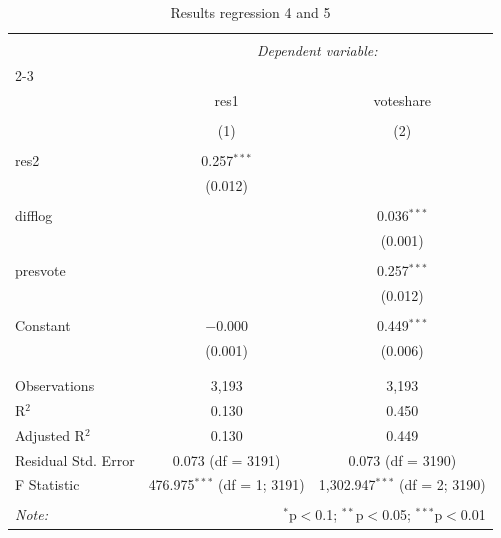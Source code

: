 \documentclass[12pt,letterpaper]{article}
\begin{document}
\begin{enumerate}
		\begin{table}[!htbp] \centering 
			\caption{Results regression 4 and 5} 
			\label{} 
			\begin{tabular}{@{\extracolsep{5pt}}lcc} 
				\\[-1.8ex]\hline 
				\hline \\[-1.8ex] 
				& \multicolumn{2}{c}{\textit{Dependent variable:}} \\ 
				\cline{2-3} 
				\\[-1.8ex] & res1 & voteshare \\ 
				\\[-1.8ex] & (1) & (2)\\ 
				\hline \\[-1.8ex] 
				res2 & 0.257$^{***}$ &  \\ 
				& (0.012) &  \\ 
				& & \\ 
				difflog &  & 0.036$^{***}$ \\ 
				&  & (0.001) \\ 
				& & \\ 
				presvote &  & 0.257$^{***}$ \\ 
				&  & (0.012) \\ 
				& & \\ 
				Constant & $-$0.000 & 0.449$^{***}$ \\ 
				& (0.001) & (0.006) \\ 
				& & \\ 
				\hline \\[-1.8ex] 
				Observations & 3,193 & 3,193 \\ 
				R$^{2}$ & 0.130 & 0.450 \\ 
				Adjusted R$^{2}$ & 0.130 & 0.449 \\ 
				Residual Std. Error & 0.073 (df = 3191) & 0.073 (df = 3190) \\ 
				F Statistic & 476.975$^{***}$ (df = 1; 3191) & 1,302.947$^{***}$ (df = 2; 3190) \\ 
				\hline 
				\hline \\[-1.8ex] 
				\textit{Note:}  & \multicolumn{2}{r}{$^{*}$p$<$0.1; $^{**}$p$<$0.05; $^{***}$p$<$0.01} \\ 
			\end{tabular} 
		\end{table} 
		

\end{enumerate}
\end{document}
